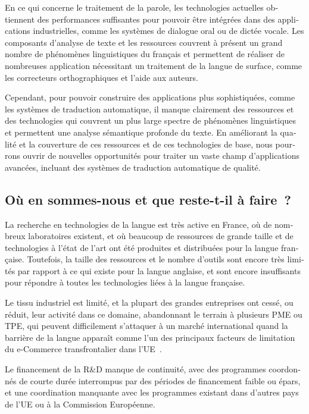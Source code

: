 \begin{french}
\begin{multicols}{2}
En ce qui concerne le traitement de la parole, les technologies
actuelles obtiennent des performances suffisantes pour pouvoir être
intégrées dans des applications industrielles, comme les systèmes de
dialogue oral ou de dictée vocale. Les composants d'analyse de texte et les
ressources couvrent à présent un grand nombre de phénomènes
linguistiques du français et permettent de réaliser de nombreuses
application nécessitant un traitement de la langue de surface,
comme les correcteurs orthographiques et l'aide aux auteurs.

Cependant, pour pouvoir construire des applications plus
sophistiquées, comme les systèmes de traduction automatique, il manque
clairement des ressources et des technologies qui couvrent un plus
large spectre de phénomènes linguistiques et permettent une analyse
sémantique profonde du texte. En améliorant la qualité et la
couverture de ces ressources et de ces technologies de base, nous
pourrons ouvrir de nouvelles opportunités pour traiter un vaste champ
d'applications avancées, incluant des systèmes de traduction
automatique de qualité.

\subsection{Où en sommes-nous et que reste-t-il à faire~?}

La recherche en technologies de la langue est très active en France,
où de nombreux laboratoires existent, et où beaucoup de ressources de
grande taille et de technologies à l'état de l'art ont été produites
et distribuées pour la langue française. Toutefois, la taille des
ressources et le nombre d'outils sont encore très limités par rapport
à ce qui existe pour la langue anglaise, et sont encore insuffisants
pour répondre à toutes les technologies liées à la langue française.

Le tissu industriel est limité, et la plupart des grandes entreprises
ont cessé, ou réduit, leur activité dans ce domaine, abandonnant le
terrain à plusieurs PME ou TPE, qui peuvent difficilement s'attaquer à
un marché international quand la barrière de la langue apparaît comme
l'un des principaux facteurs de limitation du {\mbox e-Commerce}
transfrontalier dans l'UE~\cite{euconclusion}.

Le financement de la R\&D manque de continuité, avec des programmes
coordonnés de courte durée interrompus par des périodes de financement
faible ou épars, et une coordination manquante avec les programmes
existant dans d'autres pays de l'UE ou à la Commission Européenne.


\end{multicols}
\end{french}

